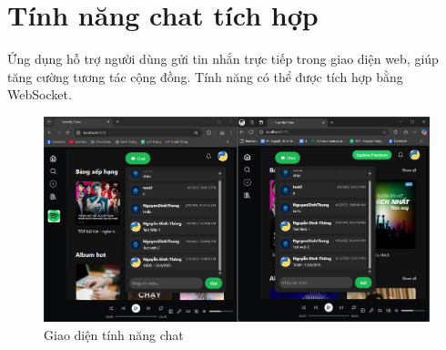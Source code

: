 \section{Tính năng chat tích hợp}
Ứng dụng hỗ trợ người dùng gửi tin nhắn trực tiếp trong giao diện web, giúp tăng cường tương tác cộng đồng. Tính năng có thể được tích hợp bằng WebSocket.

\begin{figure}[H]
    \centering
    \includegraphics[width=1\textwidth]{imgs/chap5/chat.png}
    \caption{Giao diện tính năng chat}
\end{figure}
